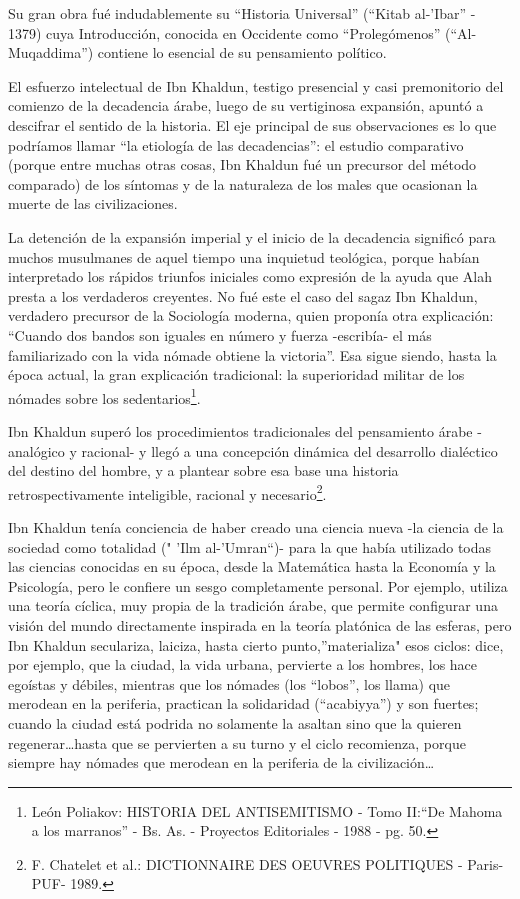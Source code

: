 \documentclass[
]{book}
\begin{document}
Su gran obra fué indudablemente su ``Historia Universal'' (``Kitab al-'Ibar'' - 1379) cuya Introducción, conocida en Occidente como ``Prolegómenos'' (``Al-Muqaddima'') contiene lo esencial de su pensamiento político.

El esfuerzo intelectual de Ibn Khaldun, testigo presencial y casi premonitorio del comienzo de la decadencia árabe, luego de su vertiginosa expansión, apuntó a descifrar el sentido de la historia. El eje principal de sus observaciones es lo que podríamos llamar ``la etiología de las decadencias'': el estudio comparativo (porque entre muchas otras cosas, Ibn Khaldun fué un precursor del método comparado) de los síntomas y de la naturaleza de los males que ocasionan la muerte de las civilizaciones.

La detención de la expansión imperial y el inicio de la decadencia significó para muchos musulmanes de aquel tiempo una inquietud teológica, porque habían interpretado los rápidos triunfos iniciales como expresión de la ayuda que Alah presta a los verdaderos creyentes. No fué este el caso del sagaz Ibn Khaldun, verdadero precursor de la Sociología moderna, quien proponía otra explicación: ``Cuando dos bandos son iguales en número y fuerza -escribía- el más familiarizado con la vida nómade obtiene la victoria''. Esa sigue siendo, hasta la época actual, la gran explicación tradicional: la superioridad militar de los nómades sobre los sedentarios\footnote{León Poliakov: HISTORIA DEL ANTISEMITISMO - Tomo II:``De Mahoma a los marranos'' - Bs. As. - Proyectos Editoriales - 1988 - pg. 50.}.

Ibn Khaldun superó los procedimientos tradicionales del pensamiento árabe -analógico y racional- y llegó a una concepción dinámica del desarrollo dialéctico del destino del hombre, y a plantear sobre esa base una historia retrospectivamente inteligible, racional y necesario\footnote{F. Chatelet et al.: DICTIONNAIRE DES OEUVRES POLITIQUES - Paris-PUF- 1989.}.

Ibn Khaldun tenía conciencia de haber creado una ciencia nueva -la ciencia de la sociedad como totalidad (" 'Ilm al-'Umran``)- para la que había utilizado todas las ciencias conocidas en su época, desde la Matemática hasta la Economía y la Psicología, pero le confiere un sesgo completamente personal. Por ejemplo, utiliza una teoría cíclica, muy propia de la tradición árabe, que permite configurar una visión del mundo directamente inspirada en la teoría platónica de las esferas, pero Ibn Khaldun seculariza, laiciza, hasta cierto punto,''materializa" esos ciclos: dice, por ejemplo, que la ciudad, la vida urbana, pervierte a los hombres, los hace egoístas y débiles, mientras que los nómades (los ``lobos'', los llama) que merodean en la periferia, practican la solidaridad (``acabiyya'') y son fuertes; cuando la ciudad está podrida no solamente la asaltan sino que la quieren regenerar\ldots hasta que se pervierten a su turno y el ciclo recomienza, porque siempre hay nómades que merodean en la periferia de la civilización\ldots{}
\end{document}
